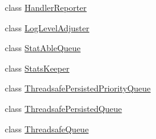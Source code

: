 \begin{DoxyCompactItemize}
class \hyperlink{classkisscpp_1_1_handler_reporter}{Handler\-Reporter}
\item 
class \hyperlink{classkisscpp_1_1_log_level_adjuster}{Log\-Level\-Adjuster}
\item 
class \hyperlink{classkisscpp_1_1_stat_able_queue}{Stat\-Able\-Queue}
\item 
class \hyperlink{classkisscpp_1_1_stats_keeper}{Stats\-Keeper}
\item 
class \hyperlink{classkisscpp_1_1_threadsafe_persisted_priority_queue}{Threadsafe\-Persisted\-Priority\-Queue}
\item 
class \hyperlink{classkisscpp_1_1_threadsafe_persisted_queue}{Threadsafe\-Persisted\-Queue}
\item 
class \hyperlink{classkisscpp_1_1_threadsafe_queue}{Threadsafe\-Queue}
\end{DoxyCompactItemize}
